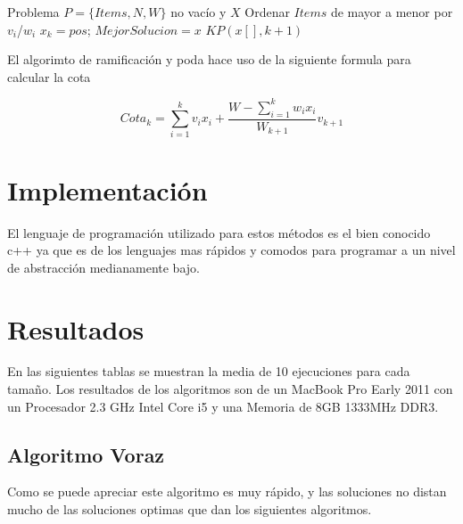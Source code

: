 \documentclass[preprint]{elsarticle}
\begin{document}
\begin{algorithm}
\begin{algorithmic}[1]
\REQUIRE Problema $P = \{Items, N, W\}$ no vac\'io y $X$
\STATE Ordenar $Items$ de mayor a menor por $v_i$/$w_i$
  \STATE $x_k = pos$;
        \STATE $MejorSolucion = x$
      \ENDIF
      \STATE $KP(x[],k+1)$
    \ENDIF
  \ENDIF
\ENDFOR
\end{algorithmic}
\end{algorithm}

El algorimto de ramificaci\'on y poda hace uso de la siguiente formula para calcular la cota

\begin{equation}
Cota_k = \sum_{i=1}^{k} v_ix_i + \frac{W - \sum_{i=1}^{k} w_ix_i}{W_{k+1}}v_{k+1}
\end{equation}

\section{Implementaci\'on}
El lenguaje de programaci\'on utilizado para estos m\'etodos es el bien conocido c++ ya que es de los lenguajes mas r\'apidos y comodos para programar a un nivel de abstracci\'on medianamente bajo.

\pagebreak

\section{Resultados}
En las siguientes tablas se muestran la media de 10 ejecuciones para cada tama\~no. Los resultados de los algoritmos son de un MacBook Pro Early 2011 con un Procesador 2.3 GHz Intel Core i5 y una Memoria de 8GB 1333MHz DDR3.

\subsection{Algoritmo Voraz}
Como se puede apreciar este algoritmo es muy r\'apido, y las soluciones no distan mucho de las soluciones optimas que dan los siguientes algoritmos.
\end{document}
